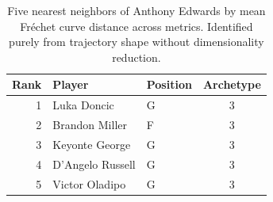 \begin{table}[htbp]
  \centering\small
  \begin{tabular}{rllc}
    \toprule
    Rank & Player & Position & Archetype \\
    \midrule
    1 & Luka Doncic & G & 3 \\
    2 & Brandon Miller & F & 3 \\
    3 & Keyonte George & G & 3 \\
    4 & D'Angelo Russell & G & 3 \\
    5 & Victor Oladipo & G & 3 \\
    \bottomrule
  \end{tabular}
  \caption{Five nearest neighbors of Anthony Edwards by mean Fr\'{e}chet curve distance across metrics. Identified purely from trajectory shape without dimensionality reduction.}
  \label{tab:Anthony_Edwards_frechet_curve_neighbors}
\end{table}


